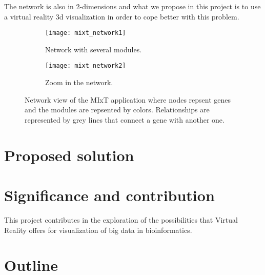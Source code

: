 The network is also in 2-dimensions and what we propose in this project is to use a virtual reality 3d visualization in order to cope better with this problem.

\begin{figure}[h!]
    \centering%
    \begin{subfigure}[t]{0.5\textwidth}
        \centering%
        \texttt{[image: mixt\_network1]}
        \caption{Network with several modules.}
        \label{fig:mixt_network1}
    \end{subfigure}%
    \begin{subfigure}[t]{0.5\textwidth}
        \centering%
        \texttt{[image: mixt\_network2]}
        \caption{Zoom in the network.}
        \label{fig:mixt_network_zoom}
    \end{subfigure}

    \caption{Network view of the MIxT application where nodes repsent genes and the modules are repsented by colors. Relationships are represented by grey lines that connect a gene with another one.}
    \label{fig:mixt_network}
\end{figure}

\section{Proposed solution}

\section{Significance and contribution}
This project contributes in the exploration of the possibilities that Virtual Reality offers for visualization of big data in bioinformatics.

\section{Outline}
